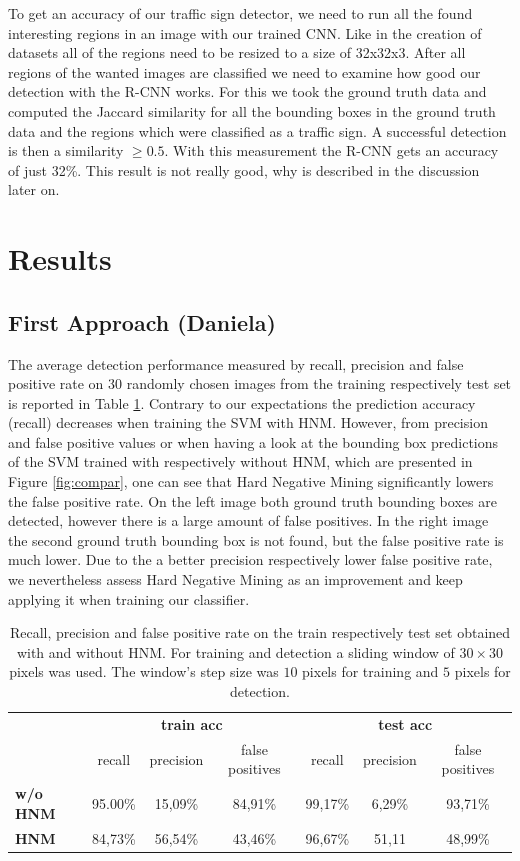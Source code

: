 \documentclass[12pt,a4paper,bibliography=totocnumbered,listof=totocnumbered]{scrartcl}
\begin{document}
To get an accuracy of our traffic sign detector, we need to run all the found interesting regions in an image with our trained CNN. Like in the creation of datasets all of the regions need to be resized to a size of 32x32x3. After all regions of the wanted images are classified we need to examine how good our detection with the R-CNN works. For this we took the ground truth data and computed the Jaccard similarity for all the bounding boxes in the ground truth data and the regions which were classified as a traffic sign. A successful detection is then a similarity $\geq 0.5$. With this measurement the R-CNN gets an accuracy of just 32\%. This result is not really good, why is described in the discussion later on.

\pagebreak
\section{Results}
\subsection{First Approach \small{(Daniela)}}

The average detection performance measured by recall, precision and false positive rate on 30 randomly chosen images from the training respectively test set is reported in Table \ref{tab:perf}. Contrary to our expectations the prediction accuracy (recall) decreases when training the SVM with HNM. However, from precision and false positive values or when having a look at the bounding box predictions of the SVM trained with respectively without HNM, which are presented in Figure \ref{fig:compar}, one can see that Hard Negative Mining significantly lowers the false positive rate. On the left image both ground truth bounding boxes are detected, however there is a large amount of false positives. In the right image the second ground truth bounding box is not found, but the false positive rate is much lower. Due to the a better precision respectively lower false positive rate, we nevertheless assess Hard Negative Mining as an improvement and keep applying it when training our classifier.

\begin{table}[H]
\centering
\caption{Recall, precision and false positive rate on the train respectively test set obtained with and without HNM. For training and detection a sliding window of $30 \times 30$ pixels was used. The window's step size was $10$ pixels for training and $5$ pixels for detection.}
\small
  \begin{tabular}{l | c c c c c c}
  	  & 
      \multicolumn{3}{c}{\textbf{train acc}} &
      \multicolumn{3}{c}{\textbf{test acc}} \\
    & recall & precision & false positives & recall & precision & false positives \\ \toprule
    \textbf{w/o HNM} & 95.00\% & 15,09\% & 84,91\% & 99,17\% &6,29\% & 93,71\% \\
    \textbf{HNM}  & 84,73\% & 56,54\% & 43,46\% & 96,67\% & 51,11 & 48,99\% \\
  \end{tabular}
  \label{tab:perf}
\end{table}
\end{document}

